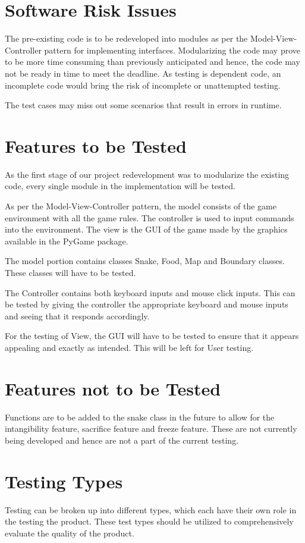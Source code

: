 \documentclass[12pt]{article}
\begin{document}
\section{Software Risk Issues}
The pre-existing code is to be redeveloped into modules as per the Model-View-Controller pattern for implementing interfaces. Modularizing the code may prove to be more time consuming than previously anticipated and hence, the code may not be ready in time to meet the deadline. As testing is dependent code, an incomplete code would bring the risk of incomplete or unattempted testing.

The test cases may miss out some scenarios that result in errors in runtime.
\section{Features to be Tested}
As the first stage of our project redevelopment was to modularize the existing code, every single module in the implementation will be tested.

As per the Model-View-Controller pattern, the model consists of the game environment with all the game rules. The controller is used to input commands into the environment. The view is the GUI of the game made by the graphics available in the PyGame package.

The model portion contains classes Snake, Food, Map and Boundary classes. These classes will have to be tested.

The Controller contains both keyboard inputs and mouse click inputs. This can be tested by giving the controller the appropriate keyboard and mouse inputs and seeing that it responds accordingly.

For the testing of View, the GUI will have to be tested to ensure that it appears appealing and exactly as intended. This will be left for User testing.
\section{Features not to be Tested}
Functions are to be added to the snake class in the future to allow for the intangibility feature, sacrifice feature and freeze feature. These are not currently being developed and hence are not a part of the current testing.

\section{Testing Types}
Testing can be broken up into different types, which each have their own role in the testing the product. These test types should be utilized to comprehensively evaluate the quality of the product.
\end{document}

